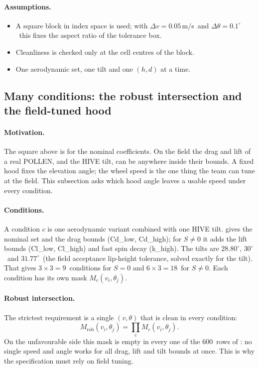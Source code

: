 \paragraph{Assumptions.}
\begin{itemize}
  \item A square block in index space is used; with $\Delta v=0.05$\,\unit{m/s}\assumed\ and
    $\Delta\theta=0.1^\circ$\assumed\ this fixes the aspect ratio of the tolerance box.
  \item Cleanliness is checked only at the cell centres of the block.
  \item One aerodynamic set, one tilt and one $(h,d)$ at a time.
\end{itemize}

\subsection{Many conditions: the robust intersection and the field-tuned hood}
\label{sec:robust_spec-hood}

\paragraph{Motivation.}
The square above is for the nominal coefficients.
On the field the drag and lift of a real POLLEN, and the HIVE tilt, can be anywhere inside their
bounds.
A fixed hood fixes the elevation angle; the wheel speed is the one thing the team can tune at the
field.
This subsection asks which hood angle leaves a usable speed under every condition.

\paragraph{Conditions.}
A condition $c$ is one aerodynamic variant combined with one HIVE tilt.
 gives the nominal set and the drag bounds (Cd\_low, Cd\_high); for
$S\ne0$ it adds the lift bounds (Cl\_low, Cl\_high) and fast spin decay (k\_high).
The tilts are $28.80^\circ$\derived, $30^\circ$\confirmed\ and $31.77^\circ$\derived\ (the field
acceptance lip-height tolerance, solved exactly for the tilt).
That gives $3\times3=9$\derived\ conditions for $S=0$ and $6\times3=18$\derived\ for $S\ne0$.
Each condition has its own mask $M_c(v_i,\theta_j)$.

\paragraph{Robust intersection.}
The strictest requirement is a single $(v,\theta)$ that is clean in every condition:
\begin{equation}
  M_{\mathrm{rob}}(v_i,\theta_j) = \prod_{c} M_c(v_i,\theta_j).
  \label{eq:robust_spec-robust}
\end{equation}
On the unfavourable side this mask is empty in every one of the 600\predicted\ rows of
: no single speed and angle works for all drag, lift and tilt bounds at
once.
This is why the specification must rely on field tuning.

